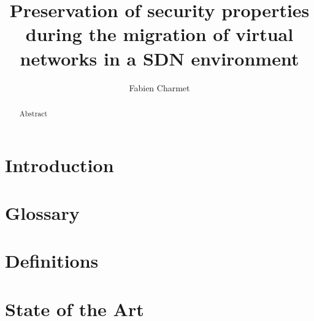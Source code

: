 \documentclass[a4paper, 11pt]{article}
\title{\LARGE \bf Preservation of security properties during the migration of virtual networks in a SDN environment}
\author{Fabien Charmet}
\newcommand{\boxedtext}[1]{\fbox{\scriptsize\bfseries\textsf{#1}}}
\newcommand{\myremark}[2]{
   \textcolor{blue}{\boxedtext{#1}
      {\small$\blacktriangleright$\emph{\textsl{#2}}$\blacktriangleleft$}
}}
\newcommand\FC[1]{\myremark{FC}{#1}}
\begin{document}
\maketitle

\begin{abstract}
Abstract
\end{abstract}

\tableofcontents
\listoffigures
 \listoftables
\thispagestyle{empty}

\newpage
\section{Introduction}

 
\section{Glossary}



\newpage
\section{Definitions}


\newpage
\section{State of the Art}

\end{document}
